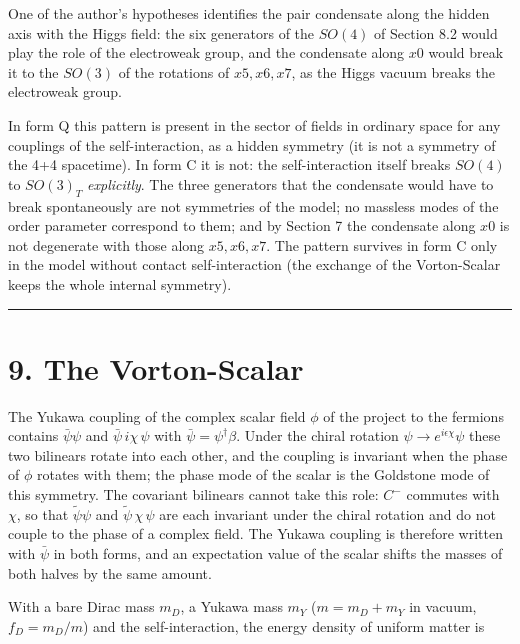\documentclass[
  10pt,
]{article}
\begin{document}
One of the author's hypotheses identifies the pair condensate along the
hidden axis with the Higgs field: the six generators of the \(SO(4)\) of
Section 8.2 would play the role of the electroweak group, and the
condensate along \(x0\) would break it to the \(SO(3)\) of the rotations
of \(x5,x6,x7\), as the Higgs vacuum breaks the electroweak group.

In form Q this pattern is present in the sector of fields in ordinary
space for any couplings of the self-interaction, as a hidden symmetry
(it is not a symmetry of the 4+4 spacetime). In form C it is not: the
self-interaction itself breaks \(SO(4)\) to \(SO(3)_T\)
\emph{explicitly}. The three generators that the condensate would have
to break spontaneously are not symmetries of the model; no massless
modes of the order parameter correspond to them; and by Section 7 the
condensate along \(x0\) is not degenerate with those along \(x5,x6,x7\).
The pattern survives in form C only in the model without contact
self-interaction (the exchange of the Vorton-Scalar keeps the whole
internal symmetry).

\begin{center}\rule{0.5\linewidth}{0.5pt}\end{center}

\hypertarget{the-vorton-scalar}{%
\section{9. The Vorton-Scalar}\label{the-vorton-scalar}}

The Yukawa coupling of the complex scalar field \(\phi\) of the project
to the fermions contains \(\bar\psi\psi\) and \(\bar\psi\,i\chi\,\psi\)
with \(\bar\psi=\psi^\dagger\beta\). Under the chiral rotation
\(\psi\to e^{i\epsilon\chi}\psi\) these two bilinears rotate into each
other, and the coupling is invariant when the phase of \(\phi\) rotates
with them; the phase mode of the scalar is the Goldstone mode of this
symmetry. The covariant bilinears cannot take this role: \(C^-\)
commutes with \(\chi\), so that \(\tilde\psi\psi\) and
\(\tilde\psi\,\chi\,\psi\) are each invariant under the chiral rotation
and do not couple to the phase of a complex field. The Yukawa coupling
is therefore written with \(\bar\psi\) in both forms, and an expectation
value of the scalar shifts the masses of both halves by the same amount.

With a bare Dirac mass \(m_D\), a Yukawa mass \(m_Y\) (\(m=m_D+m_Y\) in
vacuum, \(f_D=m_D/m\)) and the self-interaction, the energy density of
uniform matter is
\end{document}
